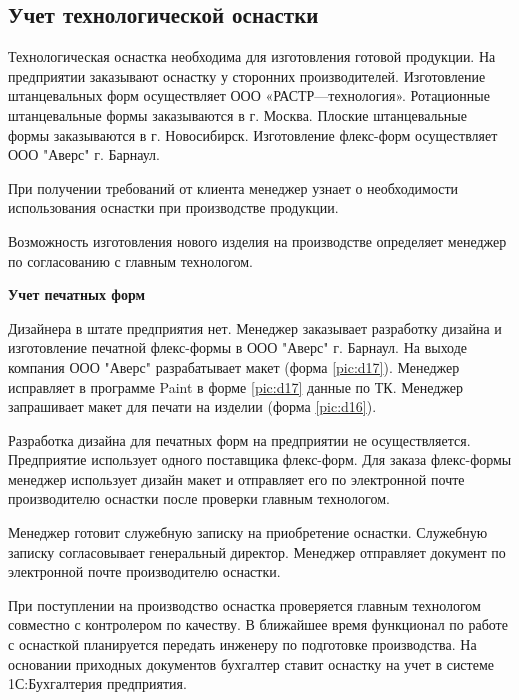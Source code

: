 \newpage
\subsection{Учет технологической оснастки }
\label{bp:rigging}
%
Технологическая оснастка необходима для изготовления готовой продукции. На предприятии заказывают оснастку у сторонних производителей. Изготовление штанцевальных форм осуществляет ООО «РАСТР—технология». Ротационные штанцевальные формы заказываются в г. Москва. Плоские штанцевальные формы заказываются в г. Новосибирск. Изготовление флекс-форм осуществляет ООО "Аверс" г. Барнаул. 

При получении требований от клиента менеджер узнает о необходимости использования оснастки при производстве продукции. 

Возможность изготовления нового изделия на производстве определяет менеджер по согласованию с главным технологом.

\textbf{Учет печатных форм}

Дизайнера в штате предприятия нет.
Менеджер заказывает разработку дизайна и изготовление печатной флекс-формы в ООО "Аверс" г. Барнаул. 
На выходе компания ООО "Аверс" разрабатывает макет (форма \ref{pic:d17}). Менеджер исправляет в программе Paint в форме \ref{pic:d17} данные по ТК.
Менеджер запрашивает макет для печати на изделии (форма \ref{pic:d16}).

Разработка дизайна для печатных форм на предприятии не осуществляется.  
Предприятие использует одного поставщика флекс-форм. 
Для заказа флекс-формы менеджер использует  дизайн макет и отправляет его по электронной почте производителю оснастки после проверки главным технологом.%

 Менеджер готовит служебную записку на приобретение оснастки. Служебную записку согласовывает генеральный директор. Менеджер отправляет документ по электронной почте производителю оснастки.

При поступлении на производство оснастка проверяется главным технологом совместно с контролером по качеству. В ближайшее время функционал по работе с оснасткой планируется передать инженеру по подготовке производства. На основании приходных документов бухгалтер ставит оснастку на учет в системе 1С:Бухгалтерия предприятия.  

